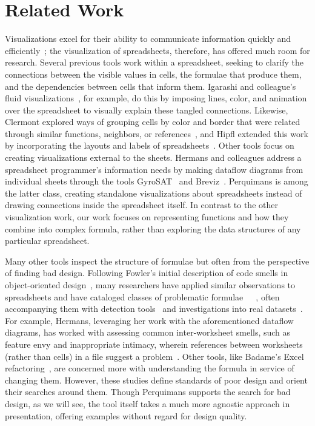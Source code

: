 \documentclass[conference]{IEEEtran}
\newcommand{\toolname}{Perquimans } \newcommand{\toolnameend}{Perquimans}
\begin{document}
	\section{Related Work} \label{related-work} Visualizations excel for their
	ability to communicate information quickly and
	efficiently~\cite{baeza1999modern}; the visualization of spreadsheets,
	therefore, has offered much room for research. Several previous tools work
	within a spreadsheet, seeking to clarify the connections between the visible
	values in cells, the formulae that produce them, and the dependencies between
	cells that inform them. Igarashi and colleague's fluid
	visualizations~\cite{igarashi1998fluid}, for example, do this by imposing
	lines, color, and animation over the spreadsheet to visually explain these
	tangled connections. Likewise, Clermont explored ways of grouping cells by
	color and border that were related through similar functions, neighbors, or
	references~\cite{clermont2003scalable}, and Hipfl extended this work by
	incorporating the layouts and labels of spreadsheets~\cite{hipfl2008using}.
	Other tools focus on creating visualizations external to the sheets. Hermans
	and colleagues address a spreadsheet programmer's information needs by making
	dataflow diagrams from individual sheets through the tools
	GyroSAT~\cite{hermans2011supporting} and Breviz~\cite{hermans2011breviz}.
	\toolname is among the latter class, creating standalone visualizations about
	spreadsheets instead of drawing connections inside the spreadsheet itself. In
	contrast to the other visualization work, our work focuses on representing functions and how
	they combine into complex formula, rather than exploring the data structures of any
	particular spreadsheet.  \par
	
	Many other tools inspect the structure of formulae but often from the
	perspective of finding bad design.  Following Fowler's initial description of
	code smells in object-oriented design~\cite{fowler2009refactoring}, many
	researchers have applied similar observations to spreadsheets and have
	cataloged classes of problematic
	formulae~\cite{hermans2012detecting}~\cite{cunha2012towards}~\cite{asavametha2012detecting}, often accompanying them with detection tools~\cite{abreu2014smelling} and investigations into real datasets~\cite{jansen2015code}. For example, Hermans, leveraging her work with the aforementioned dataflow diagrams, has worked with assessing common inter-worksheet smells, such as feature envy and inappropriate intimacy, wherein references between worksheets (rather than cells) in a file suggest a problem~\cite{hermans2012detectinginter}. Other tools, like Badame's Excel refactoring~\cite{badame2012refactoring}, are concerned more with understanding the formula in service of changing them. However, these studies define standards of poor design and orient their searches around them. Though \toolname supports the search for bad design, as we will see, the tool itself takes a much more agnostic approach in presentation, offering examples without regard for design quality. \par
	
\end{document}
